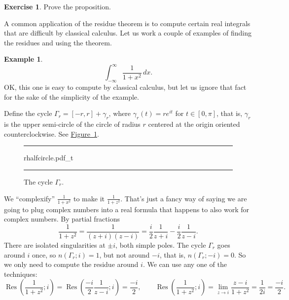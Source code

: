 \documentclass[12pt,openany]{book}
\newcommand{\myquote}[1]{``#1''}
\theoremstyle{plain}
\theoremstyle{remark}
\theoremstyle{definition}
\newenvironment{exbox}{%
    \def\FrameCommand{\vrule width 1pt \relax\hspace{10pt}}%
    \MakeFramed{\advance\hsize-\width\FrameRestore}%
}{%
    \endMakeFramed
}
\newenvironment{myfig}{%
\begin{figure}[h!t]
\noindent\rule{\textwidth}{0.5pt}\vspace{12pt}\par\centering}%
{\par\noindent\rule{\textwidth}{0.5pt}
\end{figure}}
\theoremstyle{exercise}
\newtheorem{exercise}{Exercise}[section]
\theoremstyle{example}
\newtheorem{example}[thm]{Example}
\newcommand{\figureref}[1]{\hyperref[#1]{Figure~\ref*{#1}}}
\begin{document}
\begin{exbox}
\begin{exercise}
Prove the proposition.
\end{exercise}
\end{exbox}

A common application of the residue theorem is to compute certain real
integrals that are difficult by classical calculus.  Let us work
a couple of examples of finding the residues and using the theorem.

\begin{example}
\begin{equation*}
\int_{-\infty}^\infty \frac{1}{1+x^2} \, dx .
\end{equation*}
OK\@, this one is easy to compute by classical calculus, but let us ignore
that fact for the sake of the simplicity of the example.

Define the cycle $\Gamma_r = [-r,r] + \gamma_r$, where $\gamma_r(t) =
re^{it}$ for $t \in [0,\pi]$, that is, $\gamma_r$ is the upper semi-circle
of the circle of radius $r$ centered at the origin oriented counterclockwise.
See \figureref{fig:rhalfcircle}.

\begin{myfig}
{rhalfcircle.pdf_t}
\caption{The cycle $\Gamma_r$.\label{fig:rhalfcircle}}
\end{myfig}

We \myquote{complexify}
$\frac{1}{1+x^2}$ to make it $\frac{1}{1+z^2}$.
That's just a fancy way of saying we are going to plug complex numbers
into a real formula that happens to also work for complex numbers.
By partial fractions
\begin{equation*}
\frac{1}{1+z^2} = \frac{1}{(z+i)(z-i)} =
\frac{i}{2} \frac{1}{z+i} - 
\frac{i}{2} \frac{1}{z-i} .
\end{equation*}
There are isolated singularities at $\pm i$, both simple poles.  The cycle
$\Gamma_r$ goes around $i$ once, so $n(\Gamma_r;i) = 1$,
but not around $-i$, that is, $n(\Gamma_r;-i) = 0$.
So we only need to compute
the residue around $i$.  We can use any one of the techniques:
\begin{equation*}
\operatorname{Res}\left(\frac{1}{1+z^2};i\right) =
\operatorname{Res}\left(
\frac{-i}{2} \frac{1}{z-i};
i\right) = \frac{-i}{2} ,
\qquad
\operatorname{Res}\left(\frac{1}{1+z^2};i\right) =
\lim_{z \to i} \frac{z-i}{1+z^2}
=
\frac{1}{2i} = \frac{-i}{2}.
\end{equation*}


\end{example}
\end{document}

